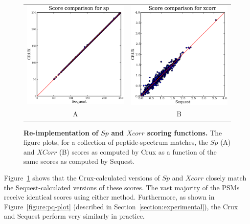 \documentclass[12pt]{article}
\begin{document}
\begin{figure}
  \centering
  \begin{tabular}{cc}
    \includegraphics[width=3in]{./Images/random-sp.eps} &
    \includegraphics[width=3in]{./Images/random-xcorr.eps} \\
  A & B \\
  \end{tabular}
  \caption{{\bf Re-implementation of $Sp$ and $Xcorr$ scoring functions.}
  The figure plots, for a collection of peptide-spectrum matches, the
  $Sp$ (A) and $XCorr$ (B) scores as computed by Crux as a function of the
  same scores as computed by {\sc Sequest}.
  \label{figure:sp-xcorr}}
\end{figure}

Figure~\ref{figure:sp-xcorr} shows that the Crux-calculated versions
of $Sp$ and $Xcorr$ closely match the {\sc Sequest}-calculated
versions of these scores.  The vast majority of the PSMs receive
identical scores using either method.  Furthermore, as shown in
Figure~\ref{figure:pq-plot} (described in
Section~\ref{section:experimental}), the Crux and {\sc Sequest}
perform very similarly in practice.
\end{document}
